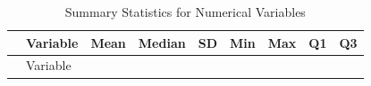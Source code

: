 \documentclass[
]{article}
\begin{document}
\begin{longtable}[]{@{}
  >{\raggedright\arraybackslash}p{}
  >{\centering\arraybackslash}p{}
  >{\centering\arraybackslash}p{}
  >{\centering\arraybackslash}p{}
  >{\centering\arraybackslash}p{}
  >{\centering\arraybackslash}p{}
  >{\centering\arraybackslash}p{}
  >{\centering\arraybackslash}p{}
  >{\centering\arraybackslash}p{}@{}}
\caption{Summary Statistics for Numerical Variables}\tabularnewline
\toprule\noalign{}
\begin{minipage}[b]{\linewidth}\raggedright
\end{minipage} & \begin{minipage}[b]{\linewidth}\centering
Variable
\end{minipage} & \begin{minipage}[b]{\linewidth}\centering
Mean
\end{minipage} & \begin{minipage}[b]{\linewidth}\centering
Median
\end{minipage} & \begin{minipage}[b]{\linewidth}\centering
SD
\end{minipage} & \begin{minipage}[b]{\linewidth}\centering
Min
\end{minipage} & \begin{minipage}[b]{\linewidth}\centering
Max
\end{minipage} & \begin{minipage}[b]{\linewidth}\centering
Q1
\end{minipage} & \begin{minipage}[b]{\linewidth}\centering
Q3
\end{minipage} \\
\midrule\noalign{}
\endfirsthead
\toprule\noalign{}
\begin{minipage}[b]{\linewidth}\raggedright
\end{minipage} & \begin{minipage}[b]{\linewidth}\centering
Variable
\end{minipage} & \begin{minipage}[b]{\linewidth}\centering

\end{minipage}
\end{longtable}
\end{document}
